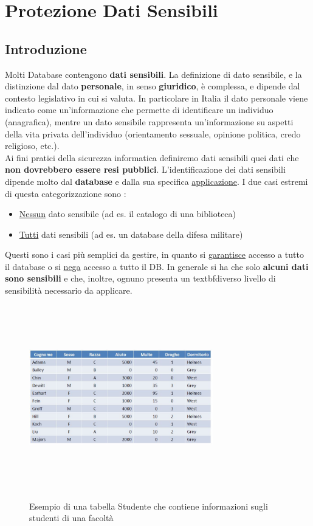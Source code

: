 \chapter{Protezione Dati Sensibili}

\section{Introduzione}
Molti Database contengono \textbf{dati sensibili}. La definizione di dato sensibile, e la distinzione dal dato \textbf{personale}, in senso \textbf{giuridico}, è complessa, e dipende dal contesto legislativo in cui si valuta. In particolare in Italia il dato personale viene indicato come un'informazione che permette di identificare un individuo (anagrafica), mentre un dato sensibile rappresenta un'informazione su aspetti della vita privata dell'individuo (orientamento sessuale, opinione politica, credo religioso, etc.). \\

Ai fini pratici della sicurezza informatica definiremo dati sensibili quei dati che \textbf{non dovrebbero essere resi pubblici}. L'identificazione dei dati sensibili dipende molto dal \textbf{database} e dalla sua specifica \underline{applicazione}. I due casi estremi di questa categorizzazione sono : 
\begin{itemize}
\item \underline{Nessun} dato sensibile (ad es. il catalogo di una biblioteca)
\item \underline{Tutti} dati sensibili (ad es. un database della difesa militare)
\end{itemize}
Questi sono i casi più semplici da gestire, in quanto si \underline{garantisce} accesso a tutto il database o si \underline{nega} accesso a tutto il DB. In generale si ha che solo \textbf{alcuni dati sono sensibili} e che, inoltre, ognuno presenta un textbf{diverso livello di sensibilità} necessario da applicare.

\begin{figure}[htbp]
	\centering
	{\includegraphics[height=8cm, width=8cm, keepaspectratio]{Immagini/Appendice1/prot_dati_01.JPG}}
	\caption{Esempio di una tabella Studente che contiene informazioni sugli studenti di una facoltà\label{fig:tabella_db}}
\end{figure}

